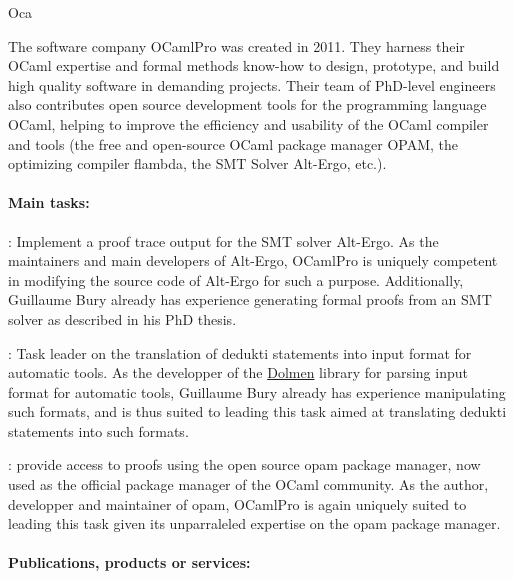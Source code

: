 \begin{sitedescription}{Oca}


The software company OCamlPro was created in 2011. They harness their OCaml expertise and formal methods know-how to design, prototype, and build high quality software in demanding projects. Their team of PhD-level engineers also contributes open source development tools for the programming language OCaml, helping to improve the efficiency and usability of the OCaml compiler and tools (the free and open-source OCaml package manager OPAM, the optimizing compiler flambda, the SMT Solver Alt-Ergo, etc.).

\paragraph*{Main tasks:}

\begin{compactitem}
\item {}: Implement a proof trace output for
  the SMT solver Alt-Ergo. As the maintainers and main developers of Alt-Ergo,
  OCamlPro is uniquely competent in modifying the source code of Alt-Ergo
  for such a purpose. Additionally, Guillaume Bury already has experience
  generating formal proofs from an SMT solver as described in his PhD
  thesis\cite{BURY19}.
\item {}: Task leader on the translation of
  dedukti statements into input format for automatic tools. As the developper
  of the \href{https://github.com/Gbury/dolmen}{Dolmen} library for parsing input format for automatic
  tools, Guillaume Bury already has experience manipulating such formats,
  and is thus suited to leading this task aimed at translating dedukti
  statements into such formats.
\item {}: provide access to proofs using the open source opam
  package manager, now used as the official package manager of the OCaml community. 
  As the author, developper and maintainer of opam,
  OCamlPro is again uniquely suited to leading this task given its
  unparraleled expertise on the opam package manager.
\end{compactitem}

\paragraph*{Publications, products or services:}


\end{sitedescription}

